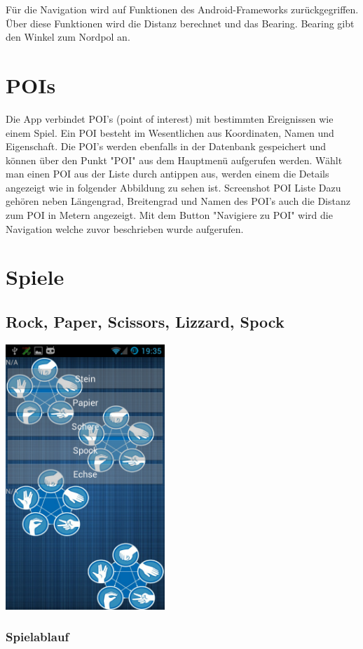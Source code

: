 Für die Navigation wird auf Funktionen des Android-Frameworks zurückgegriffen. Über diese Funktionen wird die Distanz berechnet und das Bearing. Bearing gibt den Winkel zum Nordpol an.

\section{POIs}
Die App verbindet POI's (point of interest)  mit bestimmten Ereignissen wie einem Spiel. Ein POI besteht im Wesentlichen aus Koordinaten, Namen und Eigenschaft.  Die POI's werden ebenfalls in der Datenbank gespeichert und können über den Punkt "POI" aus dem Hauptmenü aufgerufen werden. Wählt man einen POI aus der Liste durch antippen aus, werden einem die Details angezeigt wie in folgender Abbildung zu sehen ist.
\TODO Screenshot POI Liste
Dazu gehören neben Längengrad, Breitengrad und Namen des POI's auch die Distanz zum POI in Metern angezeigt. Mit dem Button "Navigiere zu POI" wird die Navigation welche zuvor beschrieben wurde aufgerufen.

\section{Spiele}


\subsection{Rock, Paper, Scissors, Lizzard, Spock}

\begin{capfigure}
	\includegraphics[width=6cm]{images/app/rpssl}
\end{capfigure}



\subsubsection{Spielablauf}

